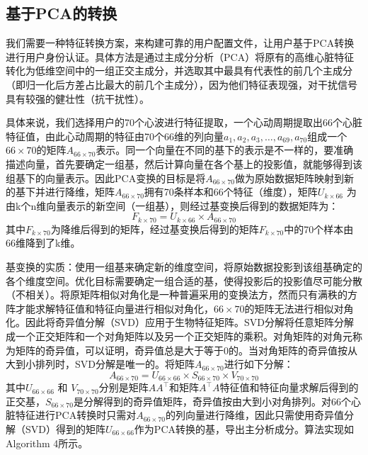 \subsection{基于PCA的转换}
{我们需要一种特征转换方案，来构建可靠的用户配置文件，让用户基于PCA\cite{1986Principal}转换进行用户身份认证。具体方法是通过主成分分析（PCA）将原有的高维心脏特征转化为低维空间中的一组正交主成分，并选取其中最具有代表性的前几个主成分（即归一化后方差占比最大的前几个主成分），因为他们特征表现强，对干扰信号具有较强的健壮性（抗干扰性）。}
\par
{具体来说，我们选择用户的70个心波进行特征提取，一个心动周期提取出66个心脏特征值，由此心动周期的特征由70个66维的列向量$a_1,a_2,a_3,\dots,a_{69},a_{70}$组成一个$66\times 70$的矩阵$A_{66\times 70}$表示。同一个向量在不同的基下的表示是不一样的，要准确描述向量，首先要确定一组基，然后计算向量在各个基上的投影值，就能够得到该组基下的向量表示。因此PCA变换的目标是将$A_{66\times 70}$做为原始数据矩阵映射到新的基下并进行降维，矩阵$A_{66\times 70}$拥有70条样本和66个特征（维度），矩阵$U_{k\times 66}$ 为由k个n维向量表示的新空间（一组基），则经过基变换后得到的数据矩阵为：}
\begin{equation}
    F_{k\times 70}= U_{k\times 66}\times A_{66\times 70}
\end{equation}
{其中$F_{k\times 70}$为降维后得到的矩阵，经过基变换后得到的矩阵$F_{k\times 70}$中的70个样本由66维降到了k维。}
\par
{基变换的实质：使用一组基来确定新的维度空间，将原始数据投影到该组基确定的各个维度空间。优化目标需要确定一组合适的基，使得投影后的投影值尽可能分散（不相关）。将原矩阵相似对角化是一种普遍采用的变换法方，然而只有满秩的方阵才能求解特征值和特征向量进行相似对角化，$66\times 70$的矩阵无法进行相似对角化。因此将奇异值分解（SVD）\cite{1993Singular}应用于生物特征矩阵。SVD分解将任意矩阵分解成一个正交矩阵和一个对角矩阵以及另一个正交矩阵的乘积。对角矩阵的对角元称为矩阵的奇异值，可以证明，奇异值总是大于等于0的。当对角矩阵的奇异值按从大到小排列时，SVD分解是唯一的。将矩阵$ A_{66\times 70}$进行如下分解：
}
\begin{equation}
    A_{66\times 70}=U_{66\times 66} \times S_{66\times 70} \times V_{70\times 70}
\end{equation}
{其中$ U_{66\times 66}$ 和 $V_{70\times 70}$分别是矩阵$AA^\intercal$和矩阵$A^\intercal A$特征值和特征向量求解后得到的正交基，$S_{66\times 70}$是分解得到的奇异值矩阵，奇异值按由大到小对角排列。对66个心脏特征进行PCA转换时只需对$A_{66\times 70}$的列向量进行降维，因此只需使用奇异值分解（SVD）得到的矩阵$ U_{66\times 66}$作为PCA转换的基，导出主分析成分。算法实现如Algorithm 4所示。}
